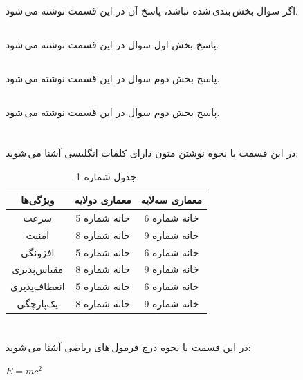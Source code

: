 \documentclass{article}
\begin{document}


\newpage

\section{}
اگر سوال بخش\,بندی\,شده نباشد، پاسخ آن در این قسمت نوشته می\,شود.
\subsection{}
پاسخ بخش اول سوال در این قسمت نوشته می\,شود.
\subsection{}
پاسخ بخش دوم سوال در این قسمت نوشته می\,شود.
\subsection{}
پاسخ بخش دوم سوال در این قسمت نوشته می\,شود.

\section{}
در این قسمت با نحوه نوشتن متون دارای کلمات انگلیسی آشنا می\,شوید:\\
\begin{table}[ht]
    \centering
    \begin{tabular}{|c|c|c|}
    \hline
    ویژگی‌ها & معماری دولایه & معماری سه‌لایه\\
    \hline
    سرعت & خانه شماره 5 & خانه شماره 6\\
    \hline
    امنیت & خانه شماره 8 & خانه شماره 9\\
    \hline
    افزونگی & خانه شماره 5 & خانه شماره 6\\
    \hline
    مقیاس‌پذیری & خانه شماره 8 & خانه شماره 9\\
    \hline
    انعطاف‌پذیری & خانه شماره 5 & خانه شماره 6\\
    \hline
    یک‌پارچگی & خانه شماره 8 & خانه شماره 9\\
    \hline
    \end{tabular}
    \caption{جدول شماره 1}
    \label{tab:tab1}
\end{table}

\section{}
در این قسمت با نحوه درج فرمول\,های ریاضی آشنا می\,شوید:
\begin{center}
$E = m{c}^{2}$
\end{center}
\end{document}
